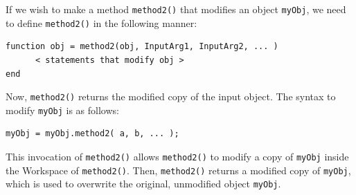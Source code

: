 If we wish to make a method \texttt{method2()} that modifies an object \texttt{myObj}, we need to define \texttt{method2()} in the following manner:
\begin{lstlisting}[style=Matlab-editor]
function obj = method2(obj, InputArg1, InputArg2, ... )
      < statements that modify obj >
end
\end{lstlisting}
Now, \texttt{method2()} returns the modified copy of the input object. The syntax to modify \texttt{myObj} is as follows:
\begin{lstlisting}[style=Matlab-editor]
myObj = myObj.method2( a, b, ... );
\end{lstlisting}
This invocation of \texttt{method2()} allows \texttt{method2()} to modify a copy of \texttt{myObj} inside the Workspace of \texttt{method2()}. Then, \texttt{method2()} returns a modified copy of \texttt{myObj}, which is used to overwrite the original, unmodified object \texttt{myObj}.

